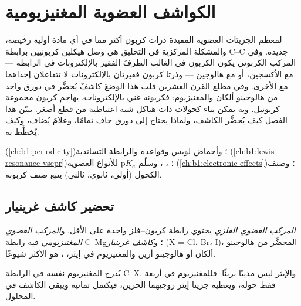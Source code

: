 \chapter{الكواشف العضوية المغنيزيومية}\label{ch:b1:organomagnesium}

لمعظم الجزيئات العضوية المفيدة ذرات كربون أكثر مما في أي
مادة أولية رخيصة، والمشكلة المركزية في التخليق هي وصل هيكلين
كربونيين برابطة C--C جديدة. وفي المركب الكربوني يكون الكربون
في الغالب الطرفَ الفقير بالإلكترونات في الرابطة --- مع الأكسجين، أو مع
هالوجين --- وذرتا كربون فقيرتان بالإلكترونات لا تتفاعلان إحداهما مع الأخرى.
وفي مطلع القرن العشرين قلب هذا الوضعَ كاشفٌ يُحضَّر في دورق واحد من
هالوجينو ألكان والمغنيزيوم: فكربونه غني بالإلكترونات،
 يهاجم كربون مجموعة كربونيل. وبه يمكن
بناء كحولات ذات هياكل شبه اعتباطية من قطع أصغر. يبيّن هذا
الفصل كيف يُحضَّر الكاشف، ولماذا يحتاج إلى دورق جاف تمامًا،
وعلامَ يُضاف، وكيف يُخطَّط به.

\begin{recall}
 (\cref{ch:b1:periodicity})؛ وأحماض لويس وقواعده
والرابطة التساندية (\cref{ch:b1:lewis-resonance-vsepr})؛ ،
،  وسلّم $\mathrm{p}K_a$ للأنواع
العضوية (\cref{ch:b1:electronic-effects})؛ وصنف الكحول
(أولي، ثانوي، ثالثي) يتبع صنف كربونه.
\end{recall}

\section{تحضير كاشف غرينيار}

\begin{definition}\label{def:b1:organomagnesium:organometallic}
\emph{المركب العضوي الفلزي} يحتوي
رابطة كربون--فلز واحدة على الأقل. و\emph{المركب العضوي
المغنيزيومي} فيه رابطة C--Mg؛
و\emph{كاشف غرينيار}  (X = Cl، Br، I)،
المحضَّر من هالوجينو ألكان أو هالوجينو أرين والمغنيزيوم في إيثر،
، هو الأكثر شيوعًا.
\end{definition}

يُدرج المغنيزيوم نفسه في الرابطة C--X. والإيثر ليس
مذيبًا بريئًا: فللمغنيزيوم في  أربعة  فقط
حوله، ويعطيه جزيئا إيثر زوجيهما الحرين، فيكتمل
ثمانيه ويبقى الكاشف في المحلول.

